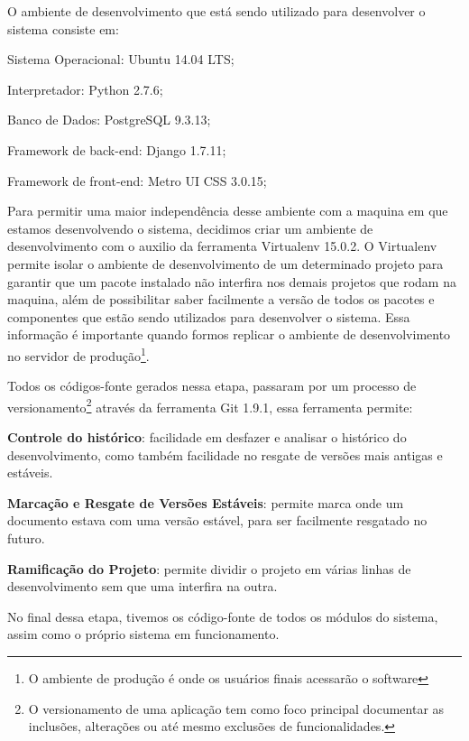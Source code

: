 O ambiente de desenvolvimento que est\'a sendo utilizado para desenvolver o sistema consiste em:
\begin{alineas}
	\item Sistema Operacional: Ubuntu 14.04 LTS;
	\item Interpretador: Python 2.7.6;
	\item Banco de Dados: PostgreSQL 9.3.13;
	\item Framework de back-end: Django 1.7.11;
	\item Framework de front-end: Metro UI CSS 3.0.15;
\end{alineas}

Para permitir uma maior independ\^encia desse ambiente com a maquina em que estamos desenvolvendo o sistema, decidimos criar um ambiente de desenvolvimento com o auxilio da 
ferramenta Virtualenv 15.0.2. O Virtualenv permite isolar o ambiente de desenvolvimento de um determinado projeto para garantir que um pacote instalado não interfira nos demais projetos que 
rodam na maquina, al\'em de possibilitar saber facilmente a vers\~ao de todos os pacotes e componentes que est\~ao sendo utilizados para desenvolver o sistema. Essa informa\c{c}\~ao \'e 
importante quando formos replicar o ambiente de desenvolvimento no servidor de produ\c{c}\~ao\footnote{O ambiente de produção é onde os usuários finais acessarão o software}. 

Todos os c\'odigos-fonte gerados nessa etapa, passaram por um processo de versionamento\footnote{O versionamento de uma aplicação tem como 
foco principal documentar as inclusões, alterações ou até mesmo exclusões de funcionalidades.} atrav\'es da ferramenta Git 1.9.1, 
essa ferramenta permite:

\begin{alineascomponto}
	\item \textbf{Controle do histórico}: facilidade em desfazer e analisar o histórico do desenvolvimento, como também facilidade no resgate de versões mais antigas e estáveis.
	\item \textbf{Marca\c{c}\~ao e Resgate de Vers\~oes Est\'aveis}: permite marca onde um documento estava com uma vers\~ao est\'avel, para ser facilmente resgatado no futuro.
	\item \textbf{Ramifica\c{c}\~ao do Projeto}: permite dividir o projeto em v\'arias linhas de desenvolvimento sem que uma interfira na outra. 
\end{alineascomponto}

No final dessa etapa, tivemos os código-fonte de todos os módulos do sistema, assim como o próprio sistema em funcionamento. 

